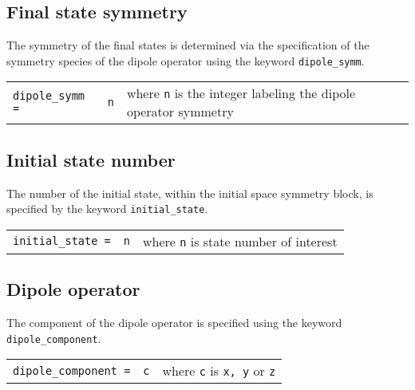 \documentclass[12pt]{article}
\newcommand*\code[1]{\mbox{\texttt{{#1}}}} %
\begin{document}
\subsection*{Final state symmetry}
\noindent
The symmetry of the final states is determined via the specification
of the symmetry species of the dipole operator using the keyword \code{dipole\_symm}.

\begin{table}[h]
\vspace*{1.7ex}
\begin{center}
\begin{tabular}{llp{2.5in}}
\code{dipole\_symm =} & \code{n}   & where \code{n} is the integer labeling the dipole operator symmetry \\
\end{tabular}
\end{center}
\end{table}

\subsection*{Initial state number}
\noindent
The number of the initial state, within the initial space symmetry
block, is specified by the keyword \code{initial\_state}.

\begin{table}[h]
\vspace*{1.7ex}
\begin{center}
\begin{tabular}{llp{2.5in}}
\code{initial\_state =} & \code{n}   & where \code{n} is state number of interest \\
\end{tabular}
\end{center}
\end{table}

\subsection*{Dipole operator}
\noindent
The component of the dipole operator is specified using the keyword \code{dipole\_component}.

\begin{table}[h]
\vspace*{1.7ex}
\begin{center}
\begin{tabular}{llp{2.5in}}
\code{dipole\_component =} & \code{c}   & where \code{c} is \code{x, y} or \code{z} \\
\end{tabular}
\end{center}
\end{table}
\end{document}

